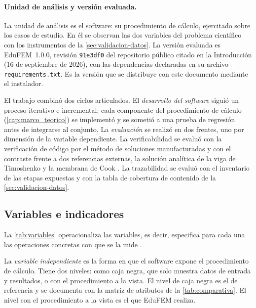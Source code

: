 \paragraph{Unidad de análisis y versión evaluada.} La unidad de análisis es el software: su procedimiento de cálculo, ejercitado sobre los casos de estudio. En él se observan las dos variables del problema científico con los instrumentos de la \autoref{sec:validacion-datos}. La versión evaluada es EduFEM~1.0.0, revisión \texttt{91e3df0} del repositorio público citado en la Introducción (16 de septiembre de 2026), con las dependencias declaradas en su archivo \texttt{requirements.txt}. Es la versión que se distribuye con este documento mediante el instalador.

El trabajo combinó dos ciclos articulados. El \emph{desarrollo del software} siguió un proceso iterativo e incremental: cada componente del procedimiento de cálculo (\autoref{cap:marco_teorico}) se implementó y se sometió a una prueba de regresión antes de integrarse al conjunto. La \emph{evaluación} se realizó en dos frentes, uno por dimensión de la variable dependiente. La verificabilidad se evaluó con la verificación de código por el método de soluciones manufacturadas y con el contraste frente a dos referencias externas, la solución analítica de la viga de Timoshenko y la membrana de Cook \autocite{oberkampf2010vv,salari2000mms}. La trazabilidad se evaluó con el inventario de las etapas expuestas y con la tabla de cobertura de contenido de la \autoref{sec:validacion-datos}.

\subsection{Variables e indicadores}
\label{sec:variables-met}

La \autoref{tab:variables} operacionaliza las variables, es decir, especifica para cada una las operaciones concretas con que se la mide \autocite[p.~137]{sampieri2018metodologia}.

La \emph{variable independiente} es la forma en que el software expone el procedimiento de cálculo. Tiene dos niveles: como caja negra, que solo muestra datos de entrada y resultados, o con el procedimiento a la vista. El nivel de caja negra es el de referencia y se documenta con la matriz de atributos de la \autoref{tab:comparativa}. El nivel con el procedimiento a la vista es el que EduFEM realiza.

